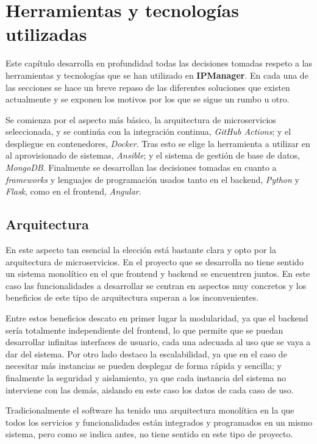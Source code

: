 \chapter{Herramientas y tecnologías utilizadas}

Este capítulo desarrolla en profundidad todas las decisiones tomadas respeto a las herramientas y tecnologías que se han utilizado en \textbf{IPManager}. En cada una de las secciones se hace un breve repaso de las diferentes soluciones que existen actualmente y se exponen los motivos por los que se sigue un rumbo u otro.

Se comienza por el aspecto más básico, la arquitectura de microservicios seleccionada, y se continúa con la integración continua, \textit{GitHub Actions}; y el despliegue en contenedores, \textit{Docker}. Tras esto se elige la herramienta a utilizar en al aprovisionado de sistemas, \textit{Ansible}; y el sistema de gestión de base de datos, \textit{MongoDB}. Finalmente se desarrollan las decisiones tomadas en cuanto a \textit{frameworks} y lenguajes de programación usados tanto en el backend, \textit{Python} y \textit{Flask}, como en el frontend, \textit{Angular}.

\section{Arquitectura}

En este aspecto tan esencial la elección está bastante clara y opto por la arquitectura de microservicios. En el proyecto que se desarrolla no tiene sentido un sistema monolítico en el que frontend y backend se encuentren juntos. En este caso las funcionalidades a desarrollar se centran en aspectos muy concretos y los beneficios de este tipo de arquitectura superan a los inconvenientes.

Entre estos beneficios descato en primer lugar la modularidad, ya que el backend sería totalmente independiente del frontend, lo que permite que se puedan desarrollar infinitas interfaces de usuario, cada una adecuada al uso que se vaya a dar del sistema. Por otro lado destaco la escalabilidad, ya que en el caso de necesitar más instancias se pueden desplegar de forma rápida y sencilla; y finalmente la seguridad y aislamiento, ya que cada instancia del sistema no interviene con las demás, aislando en este caso los datos de cada caso de uso.

Tradicionalmente el software ha tenido una arquitectura monolítica en la que todos los servicios y funcionalidades están integrados y programados en un mismo sistema, pero como se indica antes, no tiene sentido en este tipo de proyecto.

